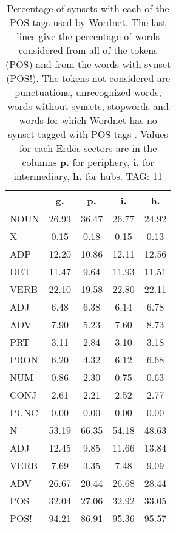 \begin{table}[h!]
\begin{center}
\begin{tabular}{| l || c | c | c | c |}\hline
 & {\bf g.} & {\bf p.} & {\bf i.} & {\bf h.} \\\hline\hline
NOUN & 26.93  & 36.47  & 26.77  & 24.92 \\
X & 0.15  & 0.18  & 0.15  & 0.13 \\\hline
ADP & 12.20  & 10.86  & 12.11  & 12.56 \\
DET & 11.47  & 9.64  & 11.93  & 11.51 \\\hline
VERB & 22.10  & 19.58  & 22.80  & 22.11 \\\hline
ADJ & 6.48  & 6.38  & 6.14  & 6.78 \\
ADV & 7.90  & 5.23  & 7.60  & 8.73 \\\hline
PRT & 3.11  & 2.84  & 3.10  & 3.18 \\
PRON & 6.20  & 4.32  & 6.12  & 6.68 \\
NUM & 0.86  & 2.30  & 0.75  & 0.63 \\
CONJ & 2.61  & 2.21  & 2.52  & 2.77 \\
PUNC & 0.00  & 0.00  & 0.00  & 0.00 \\\hline\hline\hline
N & 53.19  & 66.35  & 54.18  & 48.63 \\\hline
ADJ & 12.45  & 9.85  & 11.66  & 13.84 \\\hline
VERB & 7.69  & 3.35  & 7.48  & 9.09 \\\hline
ADV & 26.67  & 20.44  & 26.68  & 28.44 \\\hline\hline
POS & 32.04  & 27.06  & 32.92  & 33.05 \\\hline
POS! & 94.21  & 86.91  & 95.36  & 95.57 \\\hline
\end{tabular}
\caption{Percentage of synsets with each of the POS tags used by Wordnet. The last lines give the percentage of words considered from all of the tokens (POS) and from the words with synset (POS!). The tokens not considered are punctuations, unrecognized words, words without synsets, stopwords and words for which Wordnet has no synset  tagged with POS tags . Values for each Erd\"os sectors are in the columns {{\bf p.}} for periphery, {{\bf i.}} for intermediary, {{\bf h.}} for hubs. TAG: 11}
\end{center}
\end{table}